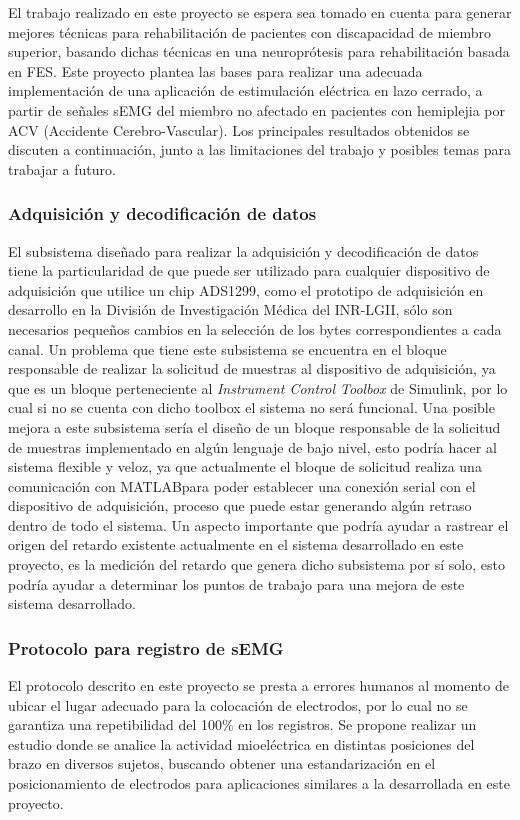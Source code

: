 El trabajo realizado en este proyecto se espera sea tomado en cuenta para generar mejores técnicas para rehabilitación de pacientes con discapacidad de miembro superior, basando dichas técnicas en una neuroprótesis para rehabilitación basada en FES. Este proyecto plantea las bases para realizar una adecuada implementación de una aplicación de estimulación eléctrica en lazo cerrado, a partir de señales sEMG del miembro no afectado en pacientes con hemiplejia por ACV (Accidente Cerebro-Vascular). Los principales resultados obtenidos se discuten a continuación, junto a las limitaciones del trabajo y posibles temas para trabajar a futuro.

\subsubsection*{Adquisición y decodificación de datos}
El subsistema diseñado para realizar la adquisición y decodificación de datos tiene la particularidad de que puede ser utilizado para cualquier dispositivo de adquisición que utilice un chip ADS1299, como el prototipo de adquisición en desarrollo en la División de Investigación Médica del INR-LGII, sólo son necesarios pequeños cambios en la selección de los bytes correspondientes a cada canal. Un problema que tiene este subsistema se encuentra en el bloque responsable de realizar la solicitud de muestras al dispositivo de adquisición, ya que es un bloque perteneciente al \emph{Instrument Control Toolbox} de Simulink\textregistered, por lo cual si no se cuenta con dicho toolbox el sistema no será funcional. Una posible mejora a este subsistema sería el diseño de un bloque responsable de la solicitud de muestras implementado en algún lenguaje de bajo nivel, esto podría hacer al sistema flexible y veloz, ya que actualmente el bloque de solicitud realiza una comunicación con MATLAB\textregistered para poder establecer una conexión serial con el dispositivo de adquisición, proceso que puede estar generando algún retraso dentro de todo el sistema. Un aspecto importante que podría ayudar a rastrear el origen del retardo existente actualmente en el sistema desarrollado en este proyecto, es la medición del retardo que genera dicho subsistema por sí solo, esto podría ayudar a determinar los puntos de trabajo para una mejora de este sistema desarrollado.

\subsubsection*{Protocolo para registro de sEMG}
El protocolo descrito en este proyecto se presta a errores humanos al momento de ubicar el lugar adecuado para la colocación de electrodos, por lo cual no se garantiza una repetibilidad del 100$\%$ en los registros. Se propone realizar un estudio donde se analice la actividad mioeléctrica en distintas posiciones del brazo en diversos sujetos, buscando obtener una estandarización en el posicionamiento de electrodos para aplicaciones similares a la desarrollada en este proyecto.

